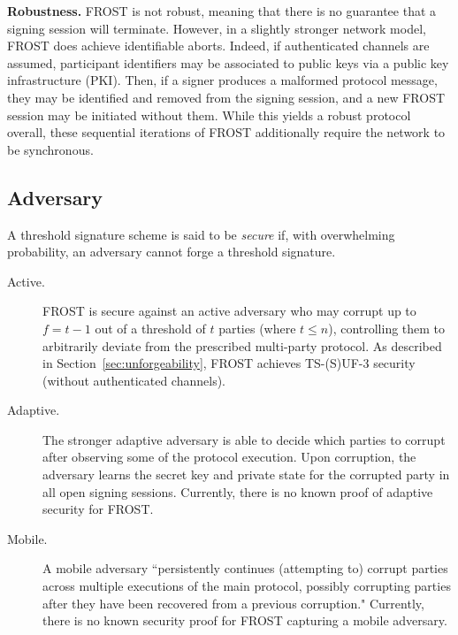 \noindent \textbf{Robustness.} FROST is not robust, meaning that there is no guarantee that a signing session will terminate.
However, in a slightly stronger network model, FROST does achieve identifiable aborts.
Indeed, if authenticated channels are assumed, participant identifiers may be associated to public keys via a public key infrastructure (PKI).
Then, if a signer produces a malformed protocol message, they may be identified and removed from the signing session, and a new FROST session may be initiated without them.
While this yields a robust protocol overall, these sequential iterations of FROST additionally require the network to be synchronous.

\subsection{Adversary}

A threshold signature scheme is said to be \emph{secure} if, with overwhelming probability, an adversary cannot forge a threshold signature.

\begin{description}

\item[Active.] FROST is secure against an active adversary who may corrupt up to $f = t-1$ out of a threshold of $t$ parties (where $t \leq n$), controlling them to arbitrarily deviate from the prescribed multi-party protocol.   As described in Section~\ref{sec:unforgeability}, FROST achieves TS-(S)UF-3 security~\cite{BellareCKMTZ22} (without authenticated channels).

\item[Adaptive.] The stronger adaptive adversary is able to decide which parties to corrupt after observing some of the protocol execution.
Upon corruption, the adversary learns the secret key and private state for the corrupted party in all open signing sessions.
Currently, there is no known proof of adaptive security for FROST.

\item[Mobile.] A mobile adversary ``persistently continues (attempting to) corrupt parties across multiple executions of the main protocol, possibly corrupting parties after they have been recovered from a previous corruption."
Currently, there is no known security proof for FROST capturing a mobile adversary.

\end{description}

